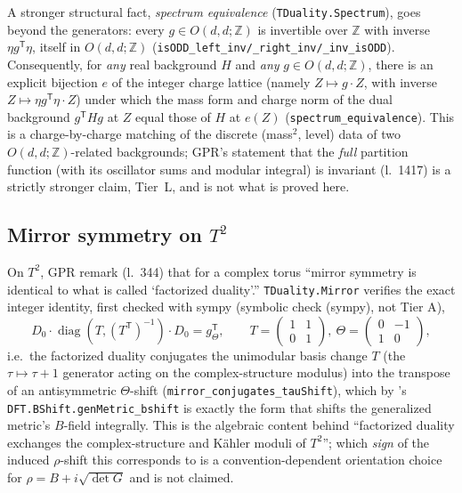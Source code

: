 \documentclass[11pt,a4paper]{article}
\theoremstyle{remark}
\newcommand{\tierS}{\colorbox{gray!15}{\textsf{\scriptsize symbolic check (sympy), not Tier A}}}
\begin{document}
A stronger structural fact, \emph{spectrum equivalence} (\texttt{TDuality.Spectrum}), goes beyond
the generators: every $g\in O(d,d;\mathbb{Z})$ is invertible over $\mathbb{Z}$ with inverse
$\eta g^{\mathsf T}\eta$, itself in $O(d,d;\mathbb{Z})$ (\texttt{isODD\_left\_inv/\_right\_inv/\_inv\_isODD}).
Consequently, for \emph{any} real background $H$ and \emph{any} $g\in O(d,d;\mathbb{Z})$, there is
an explicit bijection $e$ of the integer charge lattice (namely $Z\mapsto g\cdot Z$, with inverse
$Z\mapsto \eta g^{\mathsf T}\eta\cdot Z$) under which the mass form and charge norm of the
dual background $g^{\mathsf T}Hg$ at $Z$ equal those of $H$ at $e(Z)$
(\texttt{spectrum\_equivalence}). This is a charge-by-charge matching of the discrete
(mass$^2$, level) data of two $O(d,d;\mathbb{Z})$-related backgrounds; GPR's statement that the
\emph{full} partition function (with its oscillator sums and modular integral) is invariant
(l.~1417) is a strictly stronger claim, Tier~L, and is not what is proved here.

\subsection{Mirror symmetry on $T^2$}
On $T^2$, GPR remark (l.~344) that for a complex torus ``mirror symmetry is identical to what is
called `factorized duality'.'' \texttt{TDuality.Mirror} verifies the exact integer identity, first
checked with sympy (\tierS),
\begin{equation}
  D_0\cdot\operatorname{diag}(T,(T^{\mathsf T})^{-1})\cdot D_0 = g_\Theta^{\mathsf T},\qquad
  T=\begin{pmatrix}1&1\\0&1\end{pmatrix},\ \Theta=\begin{pmatrix}0&-1\\1&0\end{pmatrix},
\end{equation}
i.e.\ the factorized duality conjugates the unimodular basis change $T$ (the $\tau\mapsto\tau+1$
generator acting on the complex-structure modulus) into the transpose of an antisymmetric
$\Theta$-shift (\texttt{mirror\_conjugates\_tauShift}), which by 's
\texttt{DFT.BShift.genMetric\_bshift} is exactly the form that shifts the generalized metric's
$B$-field integrally. This is the algebraic content behind ``factorized duality exchanges the
complex-structure and K\"ahler moduli of $T^2$''; which \emph{sign} of the induced $\rho$-shift
this corresponds to is a convention-dependent orientation choice for $\rho=B+i\sqrt{\det G}$ and
is not claimed.
\end{document}
